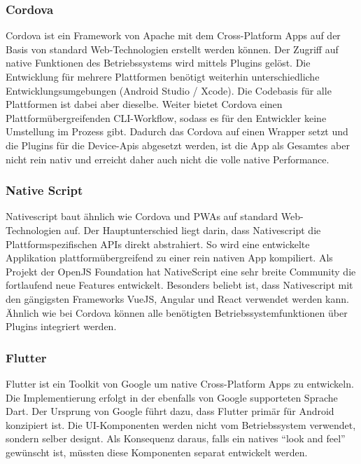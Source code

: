 \subsubsection*{Cordova}
Cordova ist ein Framework von Apache mit dem Cross-Platform Apps auf der Basis von standard Web-Technologien erstellt werden können.
Der Zugriff auf native Funktionen des Betriebssystems wird mittels Plugins gelöst.
Die Entwicklung für mehrere Plattformen benötigt weiterhin unterschiedliche Entwicklungsumgebungen (Android Studio / Xcode).
Die Codebasis für alle Plattformen ist dabei aber dieselbe.
Weiter bietet Cordova einen Plattformübergreifenden CLI-Workflow, sodass es für den Entwickler keine Umstellung im Prozess gibt.\cite{cordova-overview}
Dadurch das Cordova auf einen Wrapper setzt und die Plugins für die Device-Apis abgesetzt werden, ist die App als Gesamtes aber nicht rein nativ und erreicht daher auch nicht die volle native Performance.\cite{cordova-vs-nativescript}

\subsubsection*{Native Script}
Nativescript baut ähnlich wie Cordova und PWAs auf standard Web-Technologien auf.
Der Hauptunterschied liegt darin, dass Nativescript die Plattformspezifischen APIs direkt abstrahiert.
So wird eine entwickelte Applikation plattformübergreifend zu einer rein nativen App kompiliert.
Als Projekt der OpenJS Foundation hat NativeScript eine sehr breite Community die fortlaufend neue Features entwickelt.
Besonders beliebt ist, dass Nativescript mit den gängigsten Frameworks VueJS, Angular und React verwendet werden kann.
Ähnlich wie bei Cordova können alle benötigten Betriebssystemfunktionen über Plugins integriert werden.\cite{ns-core-overview,cordova-vs-nativescript}

\subsubsection*{Flutter}
Flutter ist ein Toolkit von Google um native Cross-Platform Apps zu entwickeln.
Die Implementierung erfolgt in der ebenfalls von Google supporteten Sprache Dart.\cite{flutter-docs}
Der Ursprung von Google führt dazu, dass Flutter primär für Android konzipiert ist.
Die UI-Komponenten werden nicht vom Betriebssystem verwendet, sondern selber designt.
Als Konsequenz daraus, falls ein natives ``look and feel'' gewünscht ist, müssten diese Komponenten separat entwickelt werden.\cite{michaelLong}

